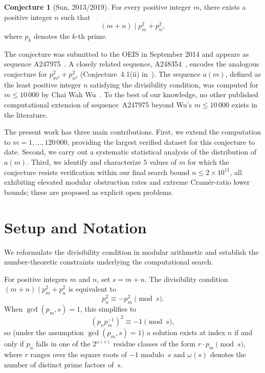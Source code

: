 \documentclass{amsart}
\theoremstyle{definition}
\newtheorem{conjecture}[theorem]{Conjecture}
\theoremstyle{remark}
\numberwithin{equation}{section}
\begin{document}
\begin{conjecture}[Sun, 2013/2019]\label{conj:sun}
	For every positive integer $m$, there exists a positive integer $n$
	such that
	\[
	(m + n) \mid p_m^2 + p_n^2,
	\]
	where $p_k$ denotes the $k$-th prime.
\end{conjecture}

The conjecture was submitted to the OEIS in September 2014 and appears
as sequence A247975~\cite{OEIS_A247975}.
A closely related sequence, A248354~\cite{OEIS_A248354}, encodes the
analogous conjecture for $p_{m^2}^2 + p_{n^2}^2$ (Conjecture~4.1(ii)
in~\cite{Sun2019}).
The sequence $a(m)$, defined as the least positive integer $n$
satisfying the divisibility condition, was computed for $m \leq 10\,000$
by Chai Wah Wu~\cite{WuOEIS}.
To the best of our knowledge, no other published computational
extension of sequence~A247975 beyond Wu's $m \leq 10\,000$ exists in
the literature.

The present work has three main contributions.
First, we extend the computation to $m = 1, \ldots, 120\,000$,
providing the largest verified dataset for this conjecture to date.
Second, we carry out a systematic statistical analysis of the
distribution of $a(m)$.
Third, we identify and characterize $5$ values of $m$ for which the
conjecture resists verification within our final search bound
$n \leq 2 \times 10^{11}$, all exhibiting elevated modular
obstruction rates and extreme Cram\'er-ratio lower bounds;
these are proposed as explicit open problems.

\section{Setup and Notation}

We reformulate the divisibility condition in modular arithmetic
and establish the number-theoretic constraints underlying the
computational search.

For positive integers $m$ and $n$, set $s = m + n$.
The divisibility condition $(m+n) \mid p_m^2 + p_n^2$ is equivalent to
\[
p_n^2 \equiv -p_m^2 \pmod{s}.
\]
When $\gcd(p_m, s) = 1$, this simplifies to
\[
\left( p_n p_m^{-1} \right)^2 \equiv -1 \pmod{s},
\]
so (under the assumption $\gcd(p_m, s) = 1$) a solution exists at
index $n$ if and only if $p_n$ falls in one of
the $2^{\omega(s)}$ residue classes of the form $r \cdot p_m \pmod{s}$,
where $r$ ranges over the square roots of $-1$ modulo~$s$
and $\omega(s)$ denotes the number of distinct prime factors of~$s$.
\end{document}
